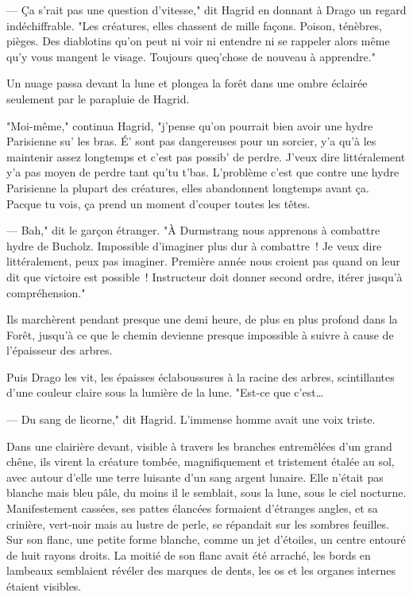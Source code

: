 --- Ça s'rait pas une question d'vitesse," dit Hagrid en donnant à Drago un regard indéchiffrable. "Les créatures, elles chassent de mille façons. Poison, ténèbres, pièges. Des diablotins qu'on peut ni voir ni entendre ni se rappeler alors même qu'y vous mangent le visage. Toujours queq'chose de nouveau à apprendre."

Un nuage passa devant la lune et plongea la forêt dans une ombre éclairée seulement par le parapluie de Hagrid.

"Moi-même," continua Hagrid, "j'pense qu'on pourrait bien avoir une hydre Parisienne su' les bras. É' sont pas dangereuses pour un sorcier, y'a qu'à les maintenir assez longtemps et c'est pas possib' de perdre. J'veux dire littéralement y'a pas moyen de perdre tant qu'tu t'bas. L'problème c'est que contre une hydre Parisienne la plupart des créatures, elles abandonnent longtemps avant ça. Pacque tu vois, ça prend un moment d'couper toutes les têtes.

--- Bah," dit le garçon étranger. "À Durmstrang nous apprenons à combattre hydre de Bucholz. Impossible d'imaginer plus dur à combattre~! Je veux dire littéralement, peux pas imaginer. Première année nous croient pas quand on leur dit que victoire est possible~! Instructeur doit donner second ordre, itérer jusqu'à compréhension."

Ils marchèrent pendant presque une demi heure, de plus en plus profond dans la Forêt, jusqu'à ce que le chemin devienne presque impossible à suivre à cause de l'épaisseur des arbres.

Puis Drago les vit, les épaisses éclaboussures à la racine des arbres, scintillantes d'une couleur claire sous la lumière de la lune. "Est-ce que c'est…

--- Du sang de licorne," dit Hagrid. L'immense homme avait une voix triste.

Dans une clairière devant, visible à travers les branches entremêlées d'un grand chêne, ils virent la créature tombée, magnifiquement et tristement étalée au sol, avec autour d'elle une terre luisante d'un sang argent lunaire. Elle n'était pas blanche mais bleu pâle, du moins il le semblait, sous la lune, sous le ciel nocturne. Manifestement cassées, ses pattes élancées formaient d'étranges angles, et sa crinière, vert-noir mais au lustre de perle, se répandait sur les sombres feuilles. Sur son flanc, une petite forme blanche, comme un jet d'étoiles, un centre entouré de huit rayons droits. La moitié de son flanc avait été arraché, les bords en lambeaux semblaient révéler des marques de dents, les os et les organes internes étaient visibles.

